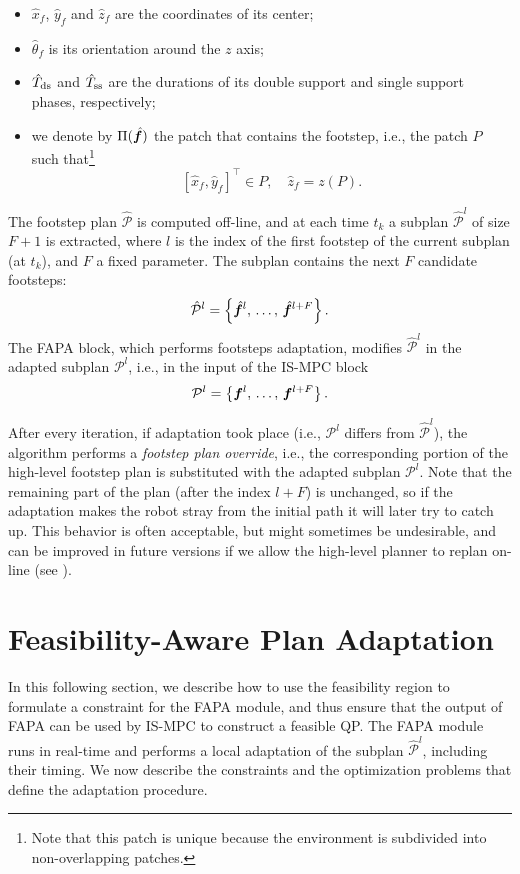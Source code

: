 \begin{itemize}
    \item $\hat x_f$, $\hat y_f$ and $\hat z_f$ are the coordinates of its center;
    \item $\hat\theta_f$ is its orientation around the $z$ axis;
    \item $\hat T_{\rm ds}$ and $\hat T_{\rm ss}$ are the durations of its  double support and single support phases, respectively;
    \item we denote by $\Pi(\hat{{\bm{f}}})$ the patch that contains the footstep, i.e., the patch $P$ such that\footnote{Note that this patch is unique because the environment is subdivided into non-overlapping patches.}
    \[
    \left[\hat{x}_f, \hat{y}_f\right]^\top \in P,\quad \hat{z}_f = z(P).
    \]
\end{itemize}

The footstep plan $\mathcal{\hat P}$ is computed off-line, and at each time
$t_k$ a subplan $\mathcal{\hat P}^l$ of size $F+1$ is extracted, where $l$ is
the index of the first footstep of the current subplan (at $t_k$), and $F$ a
fixed parameter. The subplan contains the next $F$ candidate footsteps:
\begin{equation*}
\mathcal{\hat P}^l = \left\{
\hat{{\bm{f}}}^{l},\,\dots,\,\hat{{\bm{f}}}^{l+F}
\right\}.
\end{equation*}
The FAPA block, which performs footsteps adaptation, modifies
$\mathcal{\hat P}^l$ in the adapted subplan $\mathcal{P}^l$, i.e., in the input
of the IS-MPC block
\begin{equation*}
    \mathcal{P}^l = \left\{
    {\bm{f}}^{l},\,\dots,\,{\bm{f}}^{l+F}
    \right\}.
\end{equation*}

After every iteration, if adaptation took place (i.e., $\mathcal{P}^l$ differs
from $\mathcal{\hat P}^l$), the algorithm performs a {\em footstep plan
override}, i.e., the corresponding portion of the high-level footstep plan
is substituted with the adapted subplan $\mathcal{P}^l$. Note that the
remaining part of the plan (after the index $l+F$) is unchanged, so if the
adaptation makes the robot stray from the initial path it will later try to
catch up. This behavior is often acceptable, but might sometimes be undesirable,
and can be improved in future versions if we allow the high-level planner
to replan on-line (see \cite{Cipriano2023RAS}).

\section{Feasibility-Aware Plan Adaptation}
\label{sec:FAPA:FeasibilityAwarePlanAdaptation}
In this following
section, we describe how to use the feasibility region to formulate a
constraint for the FAPA module, and thus ensure that the output of FAPA can be
used by IS-MPC to construct a feasible QP.
The FAPA module runs in real-time and performs a local adaptation of the
subplan $\mathcal{\hat P}^l$, including their timing. We now describe the
constraints and the optimization problems that define the adaptation procedure.

